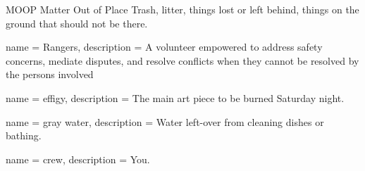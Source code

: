 %
%
%

\usepackage[acronym]{glossaries}

\usepackage{glossary-longbooktabs}


\usepackage{xparse}
 {
  \makeglossaries
}

\makeglossaries


  {MOOP}            %
  {Matter Out of Place}  %
  {Trash, litter, things lost or left behind, things on the ground that should not be there.} %
  

 {
name = {Rangers},
description = {A volunteer empowered to address safety concerns, mediate disputes, and resolve conflicts when they cannot be resolved by the persons involved}
}

 {
name = {effigy},
description = {The main art piece to be burned Saturday night.}
}

 {
name = {gray water},
description = {Water left-over from cleaning dishes or bathing.}
}

 {
name = {crew},
description = {You.}
}

